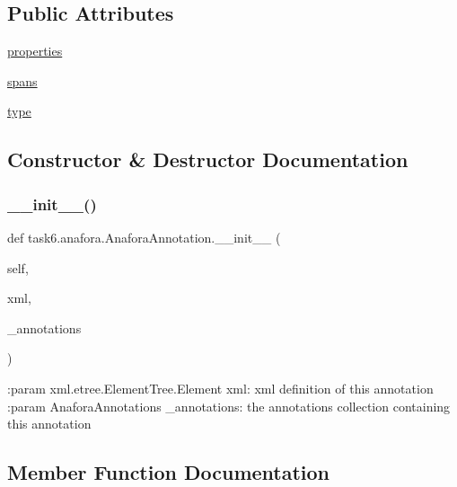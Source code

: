 \subsection*{Public Attributes}
\begin{DoxyCompactItemize}
\item 
\hyperlink{classtask6_1_1anafora_1_1AnaforaAnnotation_a833e625b84e38cb8319dd6da6053bbaa}{properties}
\item 
\hyperlink{classtask6_1_1anafora_1_1AnaforaAnnotation_a81e245e3b9fb39a2c2c60a2fe64e8d74}{spans}
\item 
\hyperlink{classtask6_1_1anafora_1_1AnaforaAnnotation_a03995de7c10cdececa79e2a6b251a13b}{type}
\end{DoxyCompactItemize}


\subsection{Constructor \& Destructor Documentation}
\mbox{\label{classtask6_1_1anafora_1_1AnaforaAnnotation_a7017a1f28088e9ec527d5ad5e8de5423}} 
\subsubsection{\texorpdfstring{\+\_\+\+\_\+init\+\_\+\+\_\+()}{\_\_init\_\_()}}
{\footnotesize\ttfamily def task6.\+anafora.\+Anafora\+Annotation.\+\_\+\+\_\+init\+\_\+\+\_\+ (\begin{DoxyParamCaption}\item[{}]{self,  }\item[{}]{xml,  }\item[{}]{\+\_\+annotations }\end{DoxyParamCaption})}

\begin{DoxyVerb}:param xml.etree.ElementTree.Element xml: xml definition of this annotation
:param AnaforaAnnotations _annotations: the annotations collection containing this annotation
\end{DoxyVerb}
 

\subsection{Member Function Documentation}
\mbox{\label{classtask6_1_1anafora_1_1AnaforaAnnotation_af48bd36508464c8b1ca5eacd8db4e5fa}} 
